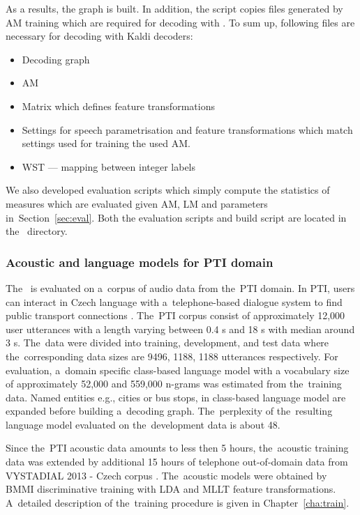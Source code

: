 As a results, the  graph is built.
In addition, the script copies files generated by \ac{AM} training which are required for decoding with .
To sum up, following files are necessary for decoding with Kaldi decoders:
\begin{itemize}
    \item Decoding graph  
    \item \acl{AM}
    \item Matrix which defines feature transformations
    \item Settings for speech parametrisation and feature transformations which match settings used for training the used \ac{AM}.
    \item \ac{WST} --- mapping between integer labels
\end{itemize}

We also developed evaluation scripts which simply compute the statistics of measures which are evaluated given \ac{AM}, \ac{LM} and parameters in~Section~\ref{sec:eval}.
Both the evaluation scripts and build  script are located in the~ directory.

\subsubsection*{Acoustic and language models for \acs{PTI} domain}
\label{sec:ptilm}
The~ is evaluated on a~corpus of audio data from the~\acf{PTI} domain.
In PTI, users can interact in Czech language with a~telephone-based dialogue system to find public transport connections \cite{ptics2014url}.
The~PTI corpus consist of approximately 12,000 user utterances with a length varying between 0.4 s and 18 s with median around 3 s.
The~data were divided into training, development, and test data where the~corresponding data sizes are 9496, 1188, 1188 utterances respectively.
For evaluation, a~domain specific class-based language model with a vocabulary size of approximately 52,000  and 559,000 n-grams was estimated from the~training data.
Named entities e.g., cities or bus stops, in class-based language model are expanded before building a~decoding graph.
The~perplexity of the~resulting language model evaluated on the~development data is about 48.

Since the~PTI acoustic data amounts to less then 5 hours, the~acoustic training data was extended by additional 15 hours of telephone out-of-domain data from VYSTADIAL 2013 - Czech corpus \cite{korvas_2014}.
The~acoustic models were obtained by BMMI discriminative training with LDA and MLLT feature transformations.
A~detailed description of the~training procedure is given in Chapter~\ref{cha:train}. 


